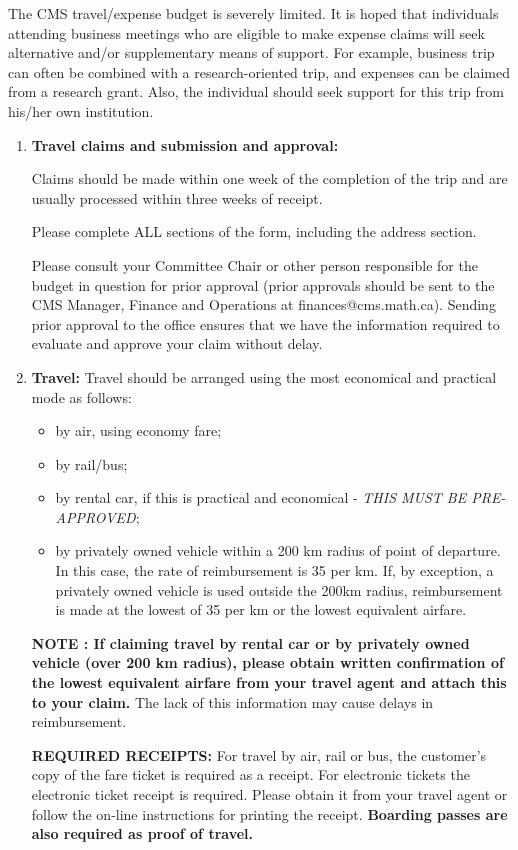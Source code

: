 \documentclass[10pt]{report}
\begin{document}
The CMS travel/expense budget is severely limited. It is hoped that
individuals attending business meetings who are eligible to make
expense claims will seek alternative and/or supplementary means of
support. For example, business trip can often be combined with a
research-oriented trip, and expenses can be claimed from a research
grant. Also, the individual should seek support for this trip from
his/her own institution.
\begin{enumerate}
\item
  {\bf Travel claims and submission and approval:}

  Claims should be made within one week of the completion of the trip
  and are usually processed within three weeks of receipt.

  Please complete ALL sections of the form, including the address section.

  Please consult your Committee Chair or other person responsible for
  the budget in question for prior approval (prior approvals should be
  sent to the CMS Manager, Finance and Operations at
  finances@cms.math.ca). Sending prior approval to the office ensures
  that we have the information required to evaluate and approve your
  claim without delay.

\item {\bf Travel:} Travel should be arranged using the most
  economical and practical mode as follows:
\begin{itemize}
  \item by air, using economy fare;
  \item by rail/bus;
  \item by rental car, if this is practical and economical -
    \emph{THIS MUST BE PRE-APPROVED};
  \item by privately owned vehicle within a 200 km radius of point of
    departure. In this case, the rate of reimbursement is
    35\textcent{} per km. If, by exception, a privately owned vehicle
    is used outside the 200km radius, reimbursement is made at the
    lowest of 35\textcent{} per km or the lowest equivalent airfare.
\end{itemize}
{\bf NOTE : If claiming travel by rental car or by privately owned
  vehicle (over 200 km radius), please obtain written confirmation of
  the lowest equivalent airfare from your travel agent and attach this
  to your claim.} The lack of this information may cause delays in
reimbursement.

{\bf REQUIRED RECEIPTS:} For travel by air, rail or bus, the
customer's copy of the fare ticket is required as a receipt. For
electronic tickets the electronic ticket receipt is required. Please
obtain it from your travel agent or follow the on-line instructions
for printing the receipt. {\bf Boarding passes are also required as
  proof of travel.}


\end{enumerate}
\end{document}
